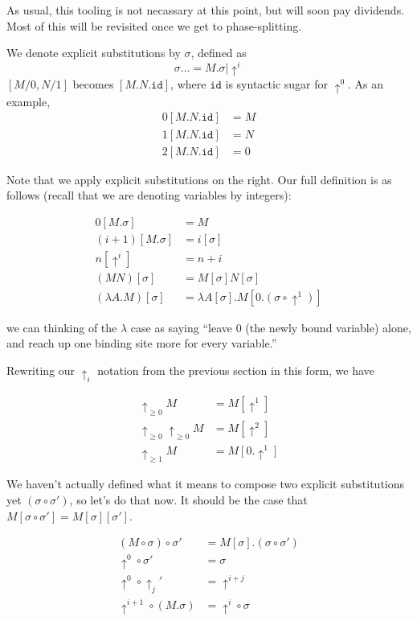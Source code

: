 \documentclass{article}
\newcommand{\id}{\ensuremath{\mathtt{id}}}
\begin{document}
As usual, this tooling is not necassary at this point, but will soon pay
dividends. Most of this will be revisited once we get to phase-splitting.

We denote explicit substitutions by $\sigma$, defined as
\[
\sigma \dots= M.\sigma | \uparrow^i
\]
$[M/0, N/1]$ becomes $[M.N.\id]$, where $\id$ is syntactic sugar for $\uparrow^0$. As an example,
\begin{align*}
0[M.N.\id] &= M\\
1[M.N.\id] &= N\\
2[M.N.\id] &= 0
\end{align*}

Note that we apply explicit substitutions on the right. Our full definition is
as follows (recall that we are denoting variables by integers):

\begin{align*}
0[M.\sigma] &= M\\
(i+1)[M.\sigma] &= i[\sigma]\\
n[\uparrow^i] &= n+i\\
(M N)[\sigma] &= M[\sigma] N [\sigma]\\
(\lambda A. M)[\sigma] &= \lambda A[\sigma]. M[0.(\sigma \circ \uparrow^1)]
\end{align*}

we can thinking of the $\lambda$ case as saying ``leave 0 (the newly bound
variable) alone, and reach up one binding site more for every variable.''

Rewriting our $\uparrow_i$ notation from the previous section in this form, we
have

\begin{align*}
\uparrow_{\geq 0} M &= M [\uparrow^1]\\
\uparrow_{\geq 0} \uparrow_{\geq 0}M &= M [\uparrow^2]\\
\uparrow_{\geq 1} M &= M [0.\uparrow^1]
\end{align*}

We haven't actually defined what it means to compose two explicit substitutions
yet $(\sigma \circ \sigma')$, so let's do that now. It should be the case that
$M[\sigma\circ\sigma'] = M[\sigma][\sigma']$.

\begin{align*}
(M\circ\sigma)\circ\sigma' &= M[\sigma].(\sigma\circ\sigma')\\
\uparrow^0\circ\sigma' &= \sigma\\
\uparrow^0\circ\uparrow_j' &= \uparrow^{i+j}\\
\uparrow^{i+1}\circ(M.\sigma) &= \uparrow^{i}\circ\sigma\\
\end{align*}
\end{document}
